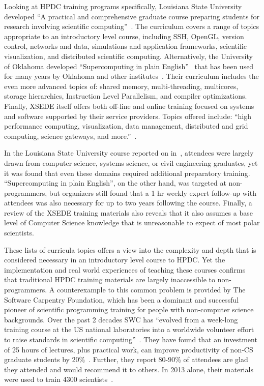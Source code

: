 \documentclass[conference]{IEEEtran}
\begin{document}
Looking at HPDC training programs specifically, Louisiana State University developed ``A practical and comprehensive graduate course preparing students for research involving scientific computing''~\cite{Allen2011-qx}. The curriculum covers a range of topics appropriate to an introductory level course, including SSH, OpenGL, version control, networks and data, simulations and application frameworks, scientific visualization, and distributed scientific computing. Alternatively, the University of Oklahoma  developed ``Supercomputing in plain English''~\cite{Neeman2002-dk} that has been used for many years by Oklahoma and other institutes~\cite{Neeman2008-mj}.  Their curriculum includes the even more advanced topics of: shared memory, multi-threading, multicores, storage hierarchies, Instruction Level Parallelism, and compiler optimizations.  Finally, XSEDE itself offers both off-line and online training focused on systems and software supported by their service providers. Topics offered include: ``high performance computing, visualization, data management, distributed and grid computing, science gateways, and more.''~\cite{noauthor_undated-ht}.  

In the Louisiana State University course reported on in~\cite{Allen2011-qx}, attendees were largely drawn from computer science, systems science, or civil engineering graduates, yet it was found that even these domains required additional preparatory training. ``Supercomputing in plain English'', on the other hand, was targeted at non-programmers, but organizers still found that a 1 hr weekly expert follow-up with attendees was also necessary for up to two years following the course.  Finally, a review of the XSEDE training materials also reveals that it also assumes a base level of Computer Science knowledge that is unreasonable to expect of most polar scientists.

These lists of curricula topics offers a view into the complexity and depth that is considered necessary in an introductory level course to HPDC. Yet the implementation and real world experiences of teaching these courses confirms that traditional HPDC training materials are largely inaccessible to non-programmers. A counterexample to this common problem is provided by The Software Carpentry Foundation, which has been a dominant and successful pioneer of scientific programming training for people with non-computer science backgrounds. Over the past 2 decades SWC has ``evolved from a week-long training course at the US national laboratories into a worldwide volunteer effort to raise standards in scientific computing''~\cite{Wilson2014-pc}. They have found that an investment of 25 hours of lectures, plus practical work, can improve productivity of non-CS graduate students by 20\%~\cite{Wilson_undated-yk}. Further, they report 80-90\% of attendees are glad they attended and would recommend it to others. In 2013 alone, their materials were used to train 4300 scientists~\cite{Wilson2014-pc}.
\end{document}
